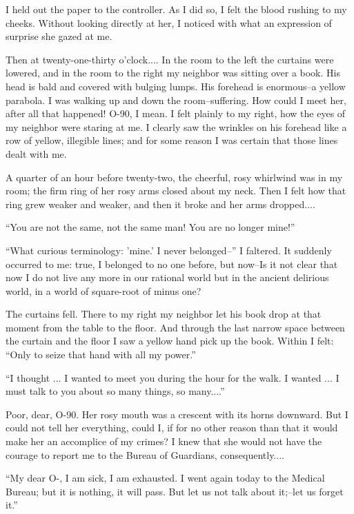 \documentclass[11pt,openany]{book}
\begin{document}
I held out the paper to the controller. As I did so, I felt the blood rushing to my cheeks. Without looking directly at her, I noticed with what an expression of surprise she gazed at me.

Then at twenty-one-thirty o'clock.... In the room to the left the curtains were lowered, and in the room to the right my neighbor was sitting over a book. His head is bald and covered with bulging lumps. His forehead is enormous--a yellow parabola. I was walking up and down the room--suffering. How could I meet her, after all that happened! O-90, I mean. I felt plainly to my right, how the eyes of my neighbor were staring at me. I clearly saw the wrinkles on his forehead like a row of yellow, illegible lines; and for some reason I was certain that those lines dealt with me.

A quarter of an hour before twenty-two, the cheerful, rosy whirlwind was in my room; the firm ring of her rosy arms closed about my neck. Then I felt how that ring grew weaker and weaker, and then it broke and her arms dropped....

``You are not the same, not the same man! You are no longer mine!''

``What curious terminology: 'mine.' I never belonged--'' I faltered. It suddenly occurred to me: true, I belonged to no one before, but now--Is it not clear that now I do not live any more in our rational world but in the ancient delirious world, in a world of square-root of minus one?

The curtains fell. There to my right my neighbor let his book drop at that moment from the table to the floor. And through the last narrow space between the curtain and the floor I saw a yellow hand pick up the book. Within I felt: ``Only to seize that hand with all my power.''

``I thought ... I wanted to meet you during the hour for the walk. I wanted ... I must talk to you about so many things, so many....''

Poor, dear, O-90. Her rosy mouth was a crescent with its horns downward. But I could not tell her everything, could I, if for no other reason than that it would make her an accomplice of my crimes? I knew that she would not have the courage to report me to the Bureau of Guardians, consequently....

``My dear O-, I am sick, I am exhausted. I went again today to the Medical Bureau; but it is nothing, it will pass. But let us not talk about it;--let us forget it.''
\end{document}
